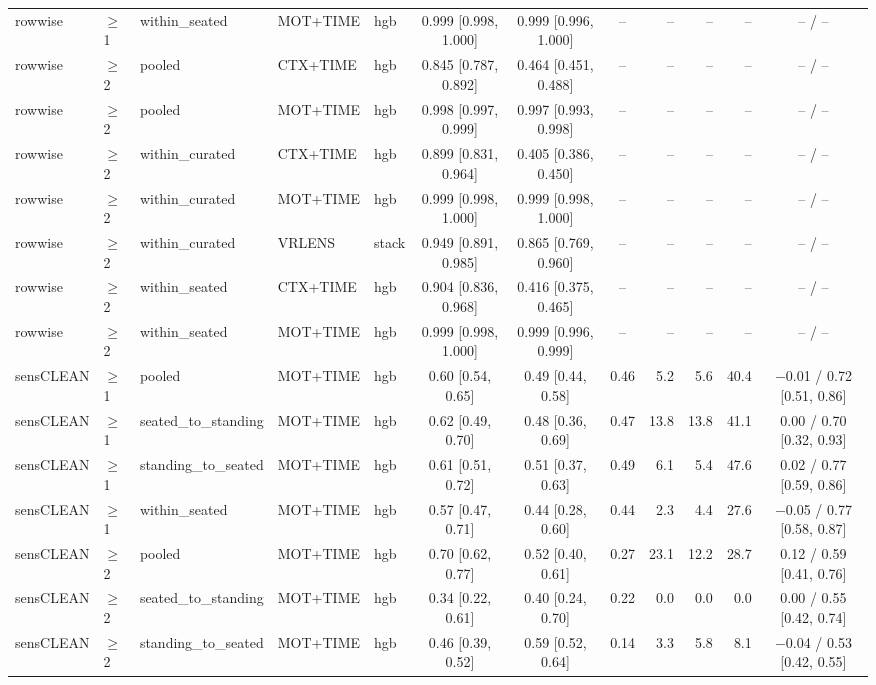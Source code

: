 \begin{longtable}{@{}lllllcccrrrc@{}}
rowwise & $\geq$1 & within\_seated & MOT+TIME & hgb & 0.999 [0.998, 1.000] & 0.999 [0.996, 1.000] & -- & -- & -- & -- & -- / -- \\
rowwise & $\geq$2 & pooled & CTX+TIME & hgb & 0.845 [0.787, 0.892] & 0.464 [0.451, 0.488] & -- & -- & -- & -- & -- / -- \\
rowwise & $\geq$2 & pooled & MOT+TIME & hgb & 0.998 [0.997, 0.999] & 0.997 [0.993, 0.998] & -- & -- & -- & -- & -- / -- \\
rowwise & $\geq$2 & within\_curated & CTX+TIME & hgb & 0.899 [0.831, 0.964] & 0.405 [0.386, 0.450] & -- & -- & -- & -- & -- / -- \\
rowwise & $\geq$2 & within\_curated & MOT+TIME & hgb & 0.999 [0.998, 1.000] & 0.999 [0.998, 1.000] & -- & -- & -- & -- & -- / -- \\
rowwise & $\geq$2 & within\_curated & VRLENS & stack & 0.949 [0.891, 0.985] & 0.865 [0.769, 0.960] & -- & -- & -- & -- & -- / -- \\
rowwise & $\geq$2 & within\_seated & CTX+TIME & hgb & 0.904 [0.836, 0.968] & 0.416 [0.375, 0.465] & -- & -- & -- & -- & -- / -- \\
rowwise & $\geq$2 & within\_seated & MOT+TIME & hgb & 0.999 [0.998, 1.000] & 0.999 [0.996, 0.999] & -- & -- & -- & -- & -- / -- \\
sensCLEAN & $\geq$1 & pooled & MOT+TIME & hgb & 0.60 [0.54, 0.65] & 0.49 [0.44, 0.58] & 0.46 & 5.2 & 5.6 & 40.4 & $-$0.01 / 0.72 [0.51, 0.86] \\
sensCLEAN & $\geq$1 & seated\_to\_standing & MOT+TIME & hgb & 0.62 [0.49, 0.70] & 0.48 [0.36, 0.69] & 0.47 & 13.8 & 13.8 & 41.1 & 0.00 / 0.70 [0.32, 0.93] \\
sensCLEAN & $\geq$1 & standing\_to\_seated & MOT+TIME & hgb & 0.61 [0.51, 0.72] & 0.51 [0.37, 0.63] & 0.49 & 6.1 & 5.4 & 47.6 & 0.02 / 0.77 [0.59, 0.86] \\
sensCLEAN & $\geq$1 & within\_seated & MOT+TIME & hgb & 0.57 [0.47, 0.71] & 0.44 [0.28, 0.60] & 0.44 & 2.3 & 4.4 & 27.6 & $-$0.05 / 0.77 [0.58, 0.87] \\
sensCLEAN & $\geq$2 & pooled & MOT+TIME & hgb & 0.70 [0.62, 0.77] & 0.52 [0.40, 0.61] & 0.27 & 23.1 & 12.2 & 28.7 & 0.12 / 0.59 [0.41, 0.76] \\
sensCLEAN & $\geq$2 & seated\_to\_standing & MOT+TIME & hgb & 0.34 [0.22, 0.61] & 0.40 [0.24, 0.70] & 0.22 & 0.0 & 0.0 & 0.0 & 0.00 / 0.55 [0.42, 0.74] \\
sensCLEAN & $\geq$2 & standing\_to\_seated & MOT+TIME & hgb & 0.46 [0.39, 0.52] & 0.59 [0.52, 0.64] & 0.14 & 3.3 & 5.8 & 8.1 & $-$0.04 / 0.53 [0.42, 0.55] \\

\end{longtable}
